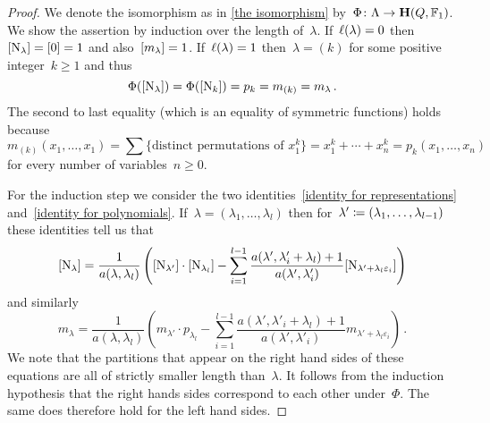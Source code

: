 \documentclass[a4paper,11pt]{scrartcl}
\begin{document}
\begin{proof}
  We denote the isomorphism as in \cref{the isomorphism} by~$\Phi \colon \Lambda \to \mathbf{H}(Q, \mathbb{F}_1)$.
  We show the assertion by induction over the length of~$\lambda$.
  If~$\ell(\lambda) = 0$ then~$[\mathrm{N}_\lambda] = [0] = 1$ and also~$[m_\lambda] = 1$.
  If~$\ell(\lambda) = 1$ then~$\lambda = (k)$ for some positive integer~$k \geq 1$ and thus
  \[
    \Phi( [ \mathrm{N}_\lambda ] )
    =
    \Phi( [ \mathrm{N}_k ] )
    =
    p_k
    =
    m_{(k)}
    =
    m_\lambda \,.
  \]
  The second to last equality (which is an equality of symmetric functions) holds because
  \[
    m_{(k)}(x_1, \dotsc, x_1)
    =
    \sum \{ \text{distinct permutations of~$x_1^k$} \}
    =
    x_1^k + \dotsb + x_n^k
    =
    p_k(x_1, \dotsc, x_n)
  \]
  for every number of variables~$n \geq 0$.

  For the induction step we consider the two identities~\eqref{identity for representations} and~\eqref{identity for polynomials}.
  If~$\lambda = (\lambda_1, \dotsc, \lambda_l)$ then for~$\lambda' \coloneqq (\lambda_1, \dotsc, \lambda_{l-1})$ these identities tell us that
  \[ 
    [ \mathrm{N}_\lambda ]
    =
    \frac{1}{a(\lambda, \lambda_l)}
    \left(
      [ \mathrm{N}_{\lambda'} ]
      \cdot
      [ \mathrm{N}_{\lambda_l} ]
      -
      \sum_{i=1}^{l-1}
      \frac{ a(\lambda', \lambda'_i + \lambda_l) + 1 }{ a(\lambda', \lambda'_i) }
      [ \mathrm{N}_{\lambda' + \lambda_l \varepsilon_i} ]
    \right)
  \]
  and similarly
  \[
    m_\lambda
    =
    \frac{1}{a(\lambda, \lambda_l)}
    \left(
      m_{\lambda'} \cdot p_{\lambda_l}
      -
      \sum_{i=1}^{l-1}
      \frac{ a(\lambda', \lambda'_i + \lambda_l) + 1 }{ a(\lambda', \lambda'_i) } 
      m_{\lambda' + \lambda_l \varepsilon_i}
    \right) \,.
  \]
  We note that the partitions that appear on the right hand sides of these equations are all of strictly smaller length than~$\lambda$.
  It follows from the induction hypothesis that the right hands sides correspond to each other under~$\Phi$.
  The same does therefore hold for the left hand sides.
\end{proof}



\printbibliography
\end{document}
